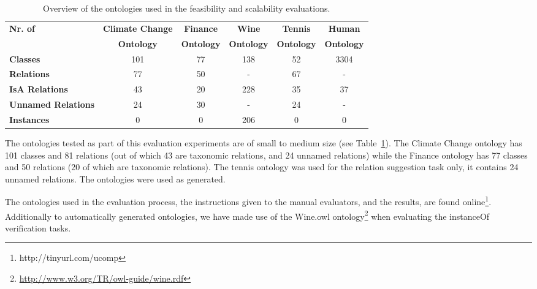 \begin{table}
\center
\begin{tabular}{|l|c|c|c|c|c|} \hline
\textbf{Nr. of} &\textbf{Climate Change}&\textbf{Finance}&\textbf{Wine}&\textbf{Tennis}&\textbf{Human}\\
&\textbf{Ontology}&\textbf{Ontology}&\textbf{Ontology}&\textbf{Ontology}&\textbf{Ontology}\\\hline
\textbf{Classes} & 101 & 77 & 138 & 52 &3304\\ \hline
\textbf{Relations} & 77 & 50 & - & 67 & - \\ \hline
\textbf{IsA Relations} & 43 & 20 & 228 & 35 & 37\\ \hline
\textbf{Unnamed Relations} & 24 & 30 & - & 24 &-\\ \hline
\textbf{Instances} & 0 & 0 & 206& 0 & 0\\ \hline

\end{tabular}
\caption{Overview of the ontologies used in the feasibility and scalability evaluations.}
\label{table:ontology_data}
\end{table}

The ontologies tested as part of this evaluation experiments are of small to medium size (see Table~\ref{table:ontology_data}). The Climate Change ontology has 101 classes and 81 relations (out of which 43 are taxonomic relations, and 24 unnamed relations) while the Finance ontology has 77 classes and 50 relations (20 of which are taxonomic relations). The tennis ontology was used for the relation suggestion task only, it contains 24 unnamed relations. The ontologies were used as generated.

The ontologies used in the evaluation process, the instructions given to the manual evaluators, and the results, are found online\footnote{http://tinyurl.com/ucomp}. 
Additionally to automatically generated ontologies, we have made use of the Wine.owl ontology\footnote{\url{http://www.w3.org/TR/owl-guide/wine.rdf}} when evaluating the instanceOf verification tasks.

